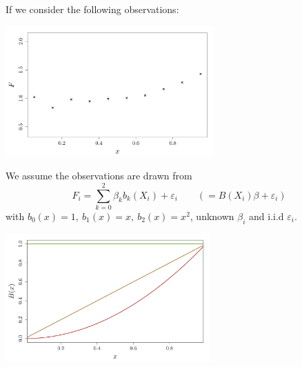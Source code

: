 \documentclass{beamer}
\begin{document}
\begin{frame}{}
\begin{example}
	If we consider the following observations: 
\begin{center}
  \includegraphics[height=5cm]{figures/R/linreg_0}
\end{center}
\vspace{-2mm}
\end{example}
\end{frame}

\begin{frame}{}
\begin{example}
    We assume the observations are drawn from 
    $$ F_i = \sum_{k=0}^2 \beta_k b_k(X_i) + \varepsilon_i \qquad (= B(X_i) \beta  + \varepsilon_i )$$
	 with $b_0(x)=1,\ b_1(x)=x,\ b_2(x)=x^2$, unknown $\beta_i$ and i.i.d $\varepsilon_i$.
\begin{center}
  \includegraphics[height=4.9cm]{figures/R/linreg_1}
\end{center}
\end{example}
\end{frame}
\end{document}
